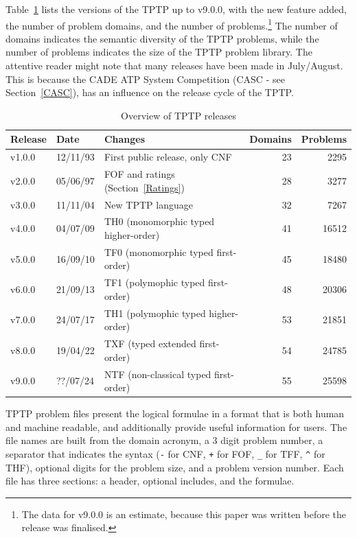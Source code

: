 \documentclass{easychair}
\begin{document}
Table~\ref{tab:Releases} lists the versions of the TPTP up to v9.0.0, with the new feature added, 
the number of problem domains, and the number of problems.\footnote{%
The data for v9.0.0 is an estimate, because this paper was written before the release was
finalised.}
The number of domains indicates the semantic diversity of the TPTP problems, while the number
of problems indicates the size of the TPTP problem library.
The attentive reader might note that many releases have been made in July/August.
This is because the CADE ATP System Competition (CASC - see Section~\ref{CASC}), has an 
influence on the release cycle of the TPTP. 

\begin{table}[htb]
\begin{center}
\setlength{\tabcolsep}{4pt}
\begin{tabular}{ll|l|rr}
Release & Date     & Changes                                              & Domains & Problems \\
\hline
v1.0.0  & 12/11/93 & First public release, only CNF \cite{SS98-JAR}       &      23 &     2295 \\
v2.0.0  & 05/06/97 & FOF \cite{Sut09} and ratings (Section~\ref{Ratings}) &      28 &     3277 \\
v3.0.0  & 11/11/04 & New TPTP language \cite{SS+06}                       &      32 &     7267 \\
v4.0.0  & 04/07/09 & TH0 (monomorphic typed higher-order) \cite{SB10}     &      41 &    16512 \\
v5.0.0  & 16/09/10 & TF0 (monomorphic typed first-order) \cite{SS+12}     &      45 &    18480 \\
v6.0.0  & 21/09/13 & TF1 (polymophic typed first-order) \cite{BP13-TFF1}  &      48 &    20306 \\
v7.0.0  & 24/07/17 & TH1 (polymophic typed higher-order) \cite{KSR16}     &      53 &    21851 \\
v8.0.0  & 19/04/22 & TXF (typed extended first-order) \cite{SK18}         &      54 &    24785 \\
v9.0.0  & ??/07/24 & NTF (non-classical typed first-order) \cite{SF+22}   &      55 &    25598 \\
\end{tabular}
\end{center}
\caption{Overview of TPTP releases}
\label{tab:Releases}
\end{table}

TPTP problem files present the logical formulae in a format that is both human and machine 
readable, and additionally provide useful information for users.
The file names are built from the domain acronym, a 3 digit problem number, a separator that
indicates the syntax ({\tt -} for CNF, {\tt +} for FOF, {\tt \_} for TFF, {\tt \verb|^|} for THF),
optional digits for the problem size, and a problem version number.
Each file has three sections: a header, optional includes, and the formulae.
\end{document}
